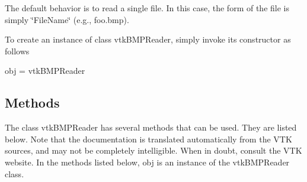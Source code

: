 The default behavior is to read a single file. In this case, the form of the file is simply \char`\"{}\-File\-Name\char`\"{} (e.\-g., foo.\-bmp).

To create an instance of class vtk\-B\-M\-P\-Reader, simply invoke its constructor as follows \begin{DoxyVerb}  obj = vtkBMPReader
\end{DoxyVerb}
 \hypertarget{vtkwidgets_vtkxyplotwidget_Methods}{}\subsection{Methods}\label{vtkwidgets_vtkxyplotwidget_Methods}
The class vtk\-B\-M\-P\-Reader has several methods that can be used. They are listed below. Note that the documentation is translated automatically from the V\-T\-K sources, and may not be completely intelligible. When in doubt, consult the V\-T\-K website. In the methods listed below, {\ttfamily obj} is an instance of the vtk\-B\-M\-P\-Reader class. 
